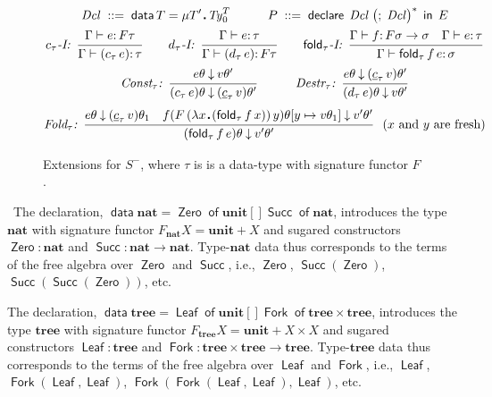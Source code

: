 \documentclass[envcountsame]{llncs}
\newcommand{\key}[1]{\ensuremath{\mathop{\mathsf{#1}}\nolimits}\xspace}
\newcommand{\Of}{\key{of}}
\newcommand{\In}{\key{in}}
\newcommand{\fold}{\key{fold}}
\newcommand{\type}[1]{\ensuremath{\mathbf{#1}}\xspace}
\newcommand{\Nat}{\type{nat}}
\newcommand{\Tree}{\type{tree}}
\newcommand{\Unit}{\ensuremath{\mathbf{unit}}\xspace}
\newcommand{\alt}{\mathrel{[\!]}}
\newcommand{\Ty}{\mathit{Ty}}
\newcommand{\constr}[1]{\ensuremath{\mathop{\mathsf{#1}}\nolimits}\xspace}
\newcommand{\Zero}{\constr{Zero}}
\newcommand{\Succ}{\constr{Succ}}
\newcommand{\Leaf}{\constr{Leaf}}
\newcommand{\Fork}{\constr{Fork}}
\newcommand{\declare}{\constr{declare}}
\newcommand{\data}{\constr{data}}
\newcommand{\lfp}[1]{\mu #1\,\sqdot\,}
\newcommand{\Dcl}{\mathit{Dcl}}
\newcommand{\entails}{\vdash}
\newcommand{\sqdot}{\rule{0.5mm}{0.5mm}}
\newcommand{\lam}[1]{\lambda #1\,\sqdot\,}
\newcommand{\is}{\ensuremath{\mathrel{\mathrel{:}\mathrel{:}=}}}
\newcommand{\yields}{\mathbin{\downarrow}}
\newcommand{\of}{\colon}
\renewcommand{\colon}{\mathpunct{:}}
\newcommand{\Quad}[1]{\hspace*{#1em}}
\newcommand{\irule}[2]{\ensuremath{{\frac{\strut\textstyle #1}{\strut\textstyle #2}}}}
\newcommand{\rulelabel}[1]{\hbox{\it #1:}\Quad{0.5}}
\newcommand{\sidecond}[1]{\Quad{0.5} \left(#1\right)}
\begin{document}
\begin{figure}[t]
\begin{minipage}{\textwidth}\small
\begin{gather}
\label{e:Ssyn}
\Dcl \;\is\; \data T =  \lfp{T'} \Ty_0^T
\Quad{3}
P \;\is\; \declare\; \Dcl \;\big(;\;\Dcl\big)^* \;\In \; E
\\[0ex]
\notag
  \rulelabel{$c_\tau$-I}
  \irule{\Gamma\entails e\of F\tau}{\Gamma\entails (c_\tau\,e)\of\tau}
  \Quad2
  \rulelabel{$d_\tau$-I}
  \irule{\Gamma\entails e\of\tau}{\Gamma\entails (d_\tau\,e) \of F\tau}
  \Quad2
  \rulelabel{$\fold_\tau$-I}
  \irule{\Gamma \entails f\of F\sigma\to\sigma
  \Quad{1} 
  \Gamma\entails e\of\tau}{\Gamma\entails \fold_\tau f \,e\of \sigma} 
  \\[0ex]
\notag
  \rulelabel{Const$_\tau$}
  \irule{e\theta \yields v\theta'}{(c_{\tau}\,e)\theta \yields (\underline{c}_{\tau}\,v)\theta'} 
  \Quad3
  \rulelabel{Destr$_\tau$}
  \irule{e\theta \yields (\underline{c}_\tau\,v)\theta'}{(d_{\tau}\,e)\theta \yields v\theta'} 
  \\[0.5ex]
\notag
  \rulelabel{Fold$_\tau$}
  \irule{e\theta\yields (\underline{c}_\tau\,v)\theta_1
  \Quad1 
  f(F\,(\lam{x}(\fold_\tau f\,x))\,y) 
      \theta[y\mapsto v\theta_1]\yields v'\theta'}{(\fold_\tau f\,e)\theta \yields v'\theta'}
  \sidecond{\hbox{$x$ and $y$ are fresh}}
\end{gather}
\caption{Extensions for $S^-$, where $\tau$  is   
is a data-type with signature functor $F$.}
\label{fig:S-}
\end{minipage}
\end{figure}




\begin{example}\label{ex:nattree} \
  The declaration,
  $\data \Nat = \Zero \Of \Unit \alt \Succ \Of \Nat$,  
  introduces the type $\Nat$ with signature functor $F_\Nat X =
  \Unit + X$ and sugared constructors $\Zero\of\Nat$ and
  $\Succ\of\Nat \to\Nat$.  Type-$\Nat$ data thus corresponds to the
  terms of the free algebra over $\Zero$ and $\Succ$, i.e., $\Zero$,
  $\Succ(\Zero)$, $\Succ(\Succ(\Zero))$, etc.
\end{example}
\begin{example}
  The declaration,
   $\data \Tree = \Leaf \Of \Unit \alt \Fork \Of \Tree\times \Tree$, 
   introduces the type $\Tree$ with signature functor $F_\Tree X =
   \Unit + X \times X$ and sugared constructors $\Leaf\of\Tree$ and
   $\Fork\of\Tree\times\Tree\to\Tree$.  Type-$\Tree$ data thus
   corresponds to the terms of the free algebra over $\Leaf$ and
   $\Fork$, i.e., $\Leaf$, $\Fork(\Leaf,\Leaf)$,
   $\Fork(\Fork(\Leaf,\Leaf),\Leaf)$, etc.
\end{example}
\end{document}
